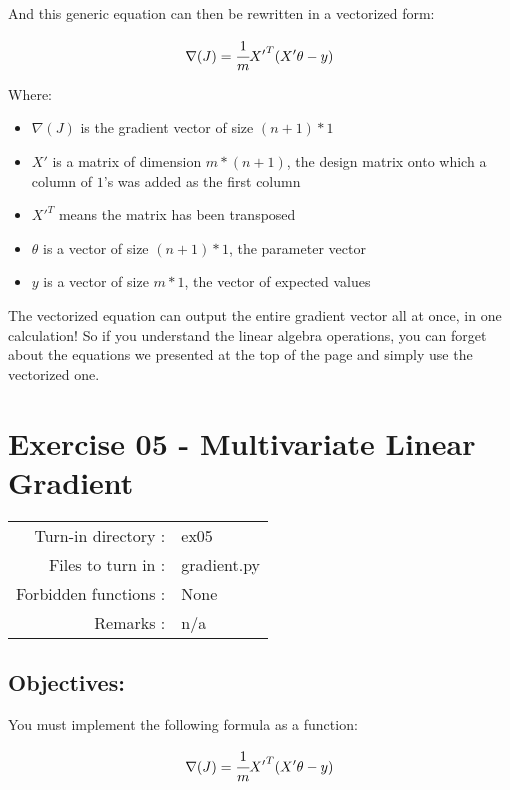 \documentclass[]{article}
\begin{document}
And this generic equation can then be rewritten in a vectorized form:

\large

\[
\nabla(J) = \cfrac{1}{m} {X'}^T(X'\theta - y)
\] \normalsize

Where:

\begin{itemize}
\item
  \(\nabla(J)\) is the gradient vector of size \((n + 1) * 1\)
\item
  \(X'\) is a matrix of dimension \(m * (n + 1)\), the design matrix
  onto which a column of \(1\)'s was added as the first column
\item
  \({X'}^T\) means the matrix has been transposed
\item
  \(\theta\) is a vector of size \((n + 1) * 1\), the parameter vector
\item
  \(y\) is a vector of size \(m * 1\), the vector of expected values
\end{itemize}

The vectorized equation can output the entire gradient vector all at
once, in one calculation! So if you understand the linear algebra
operations, you can forget about the equations we presented at the top
of the page and simply use the vectorized one. \clearpage

\hypertarget{exercise-05---multivariate-linear-gradient-1}{%
\section{Exercise 05 - Multivariate Linear
Gradient}\label{exercise-05---multivariate-linear-gradient-1}}

\begin{longtable}[]{@{}rl@{}}
\toprule
\endhead
Turn-in directory : & ex05\tabularnewline
Files to turn in : & gradient.py\tabularnewline
Forbidden functions : & None\tabularnewline
Remarks : & n/a\tabularnewline
\bottomrule
\end{longtable}

\hypertarget{objectives-3}{%
\subsection{Objectives:}\label{objectives-3}}

You must implement the following formula as a function:

\large

\[
\nabla(J) = \cfrac{1}{m} {X'}^T(X'\theta - y)
\] \normalsize
\end{document}
